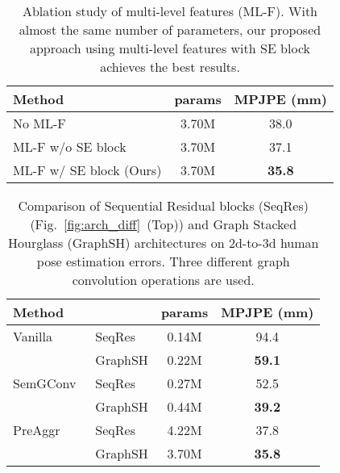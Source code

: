 \documentclass[final]{cvpr}
\begin{document}
\begin{table}
\begin{center}
\begin{tabular}{l|c|c}
\hline
Method & params & MPJPE (mm)\\
\hline\hline
No ML-F & 3.70M & 38.0 \\
ML-F w/o SE block & 3.70M & 37.1 \\
ML-F w/ SE block (Ours) & 3.70M & \textbf{35.8} \\
\hline
\end{tabular}
\end{center}
\caption{Ablation study of multi-level features (ML-F). With almost the same number of parameters, our proposed approach using multi-level features with SE block achieves the best results.}
\label{tbl:ablation_ml}
\end{table}


\begin{table}
\begin{center}
\begin{tabular}{ll|c|c}
\hline
Method &  & params & MPJPE (mm)\\
\hline\hline
Vanilla~\cite{Kipf:2016tc} & SeqRes & 0.14M & 94.4\\
   & GraphSH & 0.22M & \textbf{59.1}\\
\hline
SemGConv~\cite{zhaoCVPR19semantic} & SeqRes & 0.27M & 52.5\\
   & GraphSH & 0.44M & \textbf{39.2}\\
\hline
PreAggr~\cite{Liu2020} & SeqRes & 4.22M & 37.8\\
   & GraphSH & 3.70M & \textbf{35.8}\\
\hline
\end{tabular}
\end{center}
\caption{Comparison of Sequential Residual blocks (SeqRes) (Fig.~\ref{fig:arch_diff}~(Top)) and Graph Stacked Hourglass (GraphSH) architectures on 2d-to-3d human pose estimation errors. Three different graph convolution operations are used.}
\label{tbl:ablation_hourglass}
\end{table}
\end{document}
